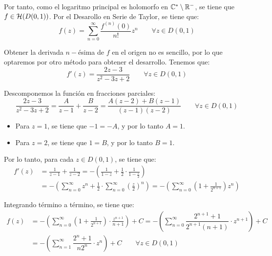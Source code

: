 \begin{ejercicio}
\begin{enumerate}
        Por tanto, como el logaritmo principal es holomorfo en $\mathbb{C}^*\setminus \mathbb{R}^-$, se tiene que $f\in \mathcal{H}(D(0,1))$. Por el Desarollo en Serie de Taylor, se tiene que:
        \begin{equation*}
            f(z) = \sum_{n=0}^{\infty} \frac{f^{(n)}(0)}{n!} z^n \qquad \forall z \in D(0,1)
        \end{equation*}

        Obtener la derivada $n-$ésima de $f$ en el origen no es sencillo, por lo que optaremos por otro método para obtener el desarrollo. Tenemos que:
        \begin{equation*}
            f'(z) = \frac{2z-3}{z^2-3z+2}\qquad \forall z \in D(0,1)
        \end{equation*}

        Descomponemos la función en fracciones parciales:
        \begin{equation*}
            \frac{2z-3}{z^2-3z+2} = \frac{A}{z-1} + \frac{B}{z-2}= \frac{A(z-2)+B(z-1)}{(z-1)(z-2)}
        \qquad \forall z \in D(0,1)
        \end{equation*}
        \begin{itemize}
            \item Para $z=1$, se tiene que $-1=-A$, y por lo tanto $A=1$.
            \item Para $z=2$, se tiene que $1=B$, y por lo tanto $B=1$.
        \end{itemize}

        Por lo tanto, para cada $z\in D(0,1)$, se tiene que:
        \begin{align*}
            f'(z) &= \frac{1}{z-1} + \frac{1}{z-2}
            = -\left(\frac{1}{1-z} + \frac{1}{2}\cdot \frac{1}{1-\frac{z}{2}}\right) \\
            &= -\left(\sum_{n=0}^{\infty} z^n + \frac{1}{2}\cdot \sum_{n=0}^{\infty} \left(\frac{z}{2}\right)^n\right)
            = -\left(\sum_{n=0}^{\infty}\left(1+\frac{1}{2^{n+1}}\right)z^n\right)
        \end{align*}

        Integrando término a término, se tiene que:
        \begin{align*}
            f(z) &= -\left(\sum_{n=0}^{\infty}\left(1+\frac{1}{2^{n+1}}\right)\cdot \frac{z^{n+1}}{n+1}\right)+C =
            -\left(\sum_{n=0}^{\infty}\dfrac{2^{n+1}+1}{2^{n+1}(n+1)}\cdot z^{n+1}\right)+C \\
            &= -\left(\sum_{n=1}^{\infty}\dfrac{2^{n}+1}{n2^n}\cdot z^{n}\right)+C\qquad \forall z \in D(0,1)
        \end{align*}


\end{enumerate}
\end{ejercicio}
